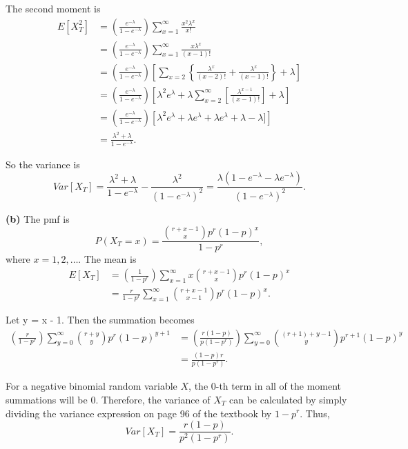 \documentclass{article}
\begin{document}
\noindent The second moment is 
\begin{align}
E[X_T^2] &= \left(\frac{e^{-\lambda}}{1-e^{-\lambda}}\right)\sum\limits_{x=1}^{\infty}\frac{x^2\lambda^x}{x!} \\
&= \left(\frac{e^{-\lambda}}{1-e^{-\lambda}}\right)\sum\limits_{x=1}^{\infty}\frac{x\lambda^x}{(x-1)!} \\
&= \left(\frac{e^{-\lambda}}{1-e^{-\lambda}}\right)\left[\sum\limits_{x=2}\left\lbrace \frac{\lambda^x}{(x-2)!} + \frac{\lambda^x}{(x-1)!}\right\rbrace + \lambda \right] \\
&= \left(\frac{e^{-\lambda}}{1-e^{-\lambda}}\right)\left[ \lambda^2e^{\lambda} + \lambda\sum\limits_{x=2}^{\infty}\left[\frac{\lambda^{x-1}}{(x-1)!}\right] + \lambda \right] \\
&= \left(\frac{e^{-\lambda}}{1-e^{-\lambda}}\right) \left[ \lambda^2e^{\lambda} + \lambda e^{\lambda} + \lambda e^{\lambda} + \lambda - \lambda] \right] \\
&= \frac{\lambda^2 + \lambda}{1-e^{-\lambda}}.
\end{align}

\noindent So the variance is $$Var[X_T] = \frac{\lambda^2 + \lambda}{1-e^{-\lambda}} - \frac{\lambda^2}{(1-e^{-\lambda})^2} = \frac{\lambda(1-e^{-\lambda} - \lambda e^{-\lambda})}{(1-e^{-\lambda})^2}.$$

\vspace{3mm}

\noindent\textbf{(b)}  The pmf is $$P(X_T = x) = \frac{{r+x-1 \choose x}p^r(1-p)^x}{1-p^r},$$ where $x = 1, 2, \ldots$.  The mean is 
\begin{align}
E[X_T] &=  \left(\frac{1}{1-p^r}\right)\sum\limits_{x=1}^{\infty}x{r+x-1 \choose x}p^r(1-p)^x \\
&= \frac{r}{1-p^r}\sum\limits_{x=1}^{\infty}{r+x-1 \choose x-1}p^r(1-p)^x.
\end{align}

\noindent Let y = x - 1.  Then the summation becomes 
\begin{align}
\left(\frac{r}{1-p^r}\right)\sum\limits_{y=0}^{\infty}{r+y \choose y}p^r(1-p)^{y+1} &= \left(\frac{r(1-p)}{p(1-p^r)}\right)\sum\limits_{y=0}^{\infty}{(r+1) + y -1 \choose y}p^{r+1}(1-p)^{y} \\
&= \frac{(1-p)r}{p(1-p^r)}.
\end{align}

\noindent For a negative binomial random variable $X$, the $0$-th term in all of the moment summations will be $0$.  Therefore, the variance of $X_T$ can be calculated by simply dividing the variance expression on page 96 of the textbook by $1-p^r$.  Thus, $$Var[X_T] = \frac{r(1-p)}{p^2(1-p^r)}.$$
\end{document}
